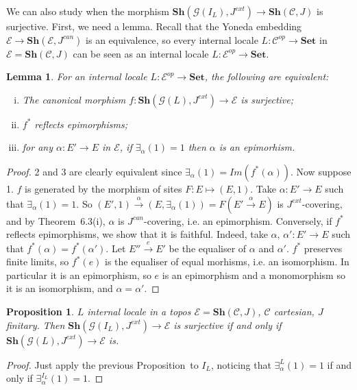 \documentclass{article}
\newtheorem{Lemma}[theorem]{Lemma}
\newtheorem{proposition}[theorem]{Proposition}
\newcommand{\Set}{\mathbf{Set}}
\begin{document}
We can also study when the morphism $\mathbf{Sh}(\mathcal{G}(I_L),J^{ext})\xrightarrow{}\mathbf{Sh}(\mathcal{C},J)$ is surjective. First, we need a lemma. Recall that the Yoneda embedding $\mathcal{E}\xrightarrow{}\mathbf{Sh}(\mathcal{E},J^{can})$ is an equivalence, so every internal locale $L:\mathcal{C}^{op}\xrightarrow{}\Set$ in $\mathcal{E}=\mathbf{Sh}(\mathcal{C},J)$ can be seen as an internal locale $L:\mathcal{E}^{op}\xrightarrow{}\Set$.

\begin{Lemma}
    For an internal locale $L:\mathcal{E}^{op}\xrightarrow{}\Set$, the following are equivalent:
    \begin{enumerate}[(i)]
        \item The canonical morphism $f:\mathbf{Sh}(\mathcal{G}(L),J^{ext})\xrightarrow{}\mathcal{E}$ is surjective;
        \item $f^*$ reflects epimorphisms;
        \item for any $\alpha:E'\xrightarrow{}E$ in $\mathcal{E}$, if $\exists_\alpha(1)=1$ then $\alpha$ is an epimorhism.
    \end{enumerate}
\end{Lemma}
\begin{proof}
    2 and 3 are clearly equivalent since $\exists_\alpha(1)=Im(f^*(\alpha))$. Now suppose 1. $f$ is generated by the morphism of sites $F:E\mapsto (E,1)$. Take $\alpha:E'\xrightarrow{}E$ such that $\exists_\alpha(1)=1$. So $(E',1)\xrightarrow{\alpha}(E,\exists_\alpha(1))=F(E'\xrightarrow{\alpha}E)$ is $J^{ext}$-covering, and by \cite{caramello2019denseness} Theorem~6.3(i), $\alpha$ is $J^{can}$-covering, i.e. an epimorphism. Conversely, if $f^*$ reflects epimorphisms, we show that it is faithful. Indeed, take $\alpha,\,\alpha':E'\xrightarrow{}E$ such that $f^*(\alpha)=f^*(\alpha')$. Let $E''\xrightarrow{e}E'$ be the equaliser of $\alpha$ and $\alpha'$. $f^*$ preserves finite limits, so $f^*(e)$ is the equaliser of equal morhisms, i.e. an isomorphism. In particular it is an epimorphism, so $e$ is an epimorphism and a monomorphism so it is an isomorphism, and $\alpha=\alpha'$.
\end{proof}

\begin{proposition}\label{surj_ideal}
    $L$ internal locale in a topos $\mathcal{E}=\mathbf{Sh}(\mathcal{C},J)$, $\mathcal{C}$ cartesian, $J$ finitary. Then $\mathbf{Sh}(\mathcal{G}(I_L),J^{ext})\xrightarrow{}\mathcal{E}$ is surjective if and only if $\mathbf{Sh}(\mathcal{G}(L),J^{ext})\xrightarrow{}\mathcal{E}$ is.
\end{proposition}
\begin{proof}
    Just apply the previous Proposition~to $I_L$, noticing that $\exists_\alpha^{L}(1)=1$ if and only if $\exists_\alpha^{I_L}(1)=1$.
\end{proof}
\end{document}
